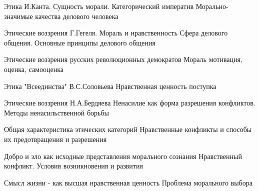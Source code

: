 \documentclass[
	14pt,
	a4paper,
	]
	{scrartcl}
\begin{document}
\vfill
\z Этика И.Канта. Сущность морали. Категорический императив
 \vfill
\z Морально-значимые качества делового человека
 \vfill

\vfill

\newpage


\shapk
{}
\setcounter{zad}{0}

\vfill
\z Этические воззрения Г.Гегеля. Мораль и нравственность
 \vfill
\z Сфера делового общения. Основные принципы делового общения
 \vfill

\vfill

\newpage


\shapk
{}
\setcounter{zad}{0}

\vfill
\z Этические воззрения русских революционных демократов
 \vfill
\z Мораль мотивация, оценка, самооценка
 \vfill

\vfill

\newpage


\shapk
{}
\setcounter{zad}{0}

\vfill
\z Этика "Всеединства" В.С.Соловьева
 \vfill
\z Нравственная ценность поступка
 \vfill

\vfill

\newpage


\shapk
{}
\setcounter{zad}{0}

\vfill
\z Этические воззрения Н.А.Бердяева
 \vfill
\z Ненасилие как форма разрешения конфликтов. Методы ненасильственной борьбы
 \vfill

\vfill

\newpage


\shapk
{}
\setcounter{zad}{0}

\vfill
\z Общая характеристика этических категорий
 \vfill
\z Нравственные конфликты и способы их предотвращения и разрешения
 \vfill

\vfill

\newpage


\shapk
{}
\setcounter{zad}{0}

\vfill
\z Добро и зло как исходные представления морального сознания
 \vfill
\z Нравственный конфликт. Условия возникновения и развития
 \vfill

\vfill

\newpage


\shapk
{}
\setcounter{zad}{0}

\vfill
\z Смысл жизни - как высшая нравственная ценность
 \vfill
\z Проблема морального выбора
 \vfill

\vfill

\newpage
\end{document}
